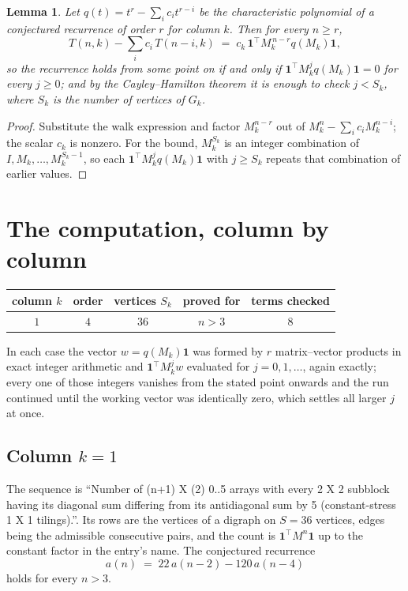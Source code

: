 \documentclass[11pt,a4paper]{article}
\theoremstyle{plain}
\newtheorem{lemma}[theorem]{Lemma}
\theoremstyle{definition}
\begin{document}
\begin{lemma}\label{lem:crit}
Let $q(t)=t^{r}-\sum_i c_it^{r-i}$ be the characteristic polynomial of a conjectured
recurrence of order $r$ for column $k$. Then for every $n\ge r$,
\[
T(n,k)-\sum_i c_i\,T(n-i,k)\;=\;c_k\,\mathbf{1}^{\!\top}M_k^{\,n-r}q(M_k)\mathbf{1},
\]
so the recurrence holds from some point on if and only if
$\mathbf{1}^{\!\top}M_k^{j}q(M_k)\mathbf{1}=0$ for every $j\ge0$; and by the
Cayley--Hamilton theorem it is enough to check $j<S_k$, where $S_k$ is the number of vertices
of $G_k$.
\end{lemma}

\begin{proof}
Substitute the walk expression and factor $M_k^{n-r}$ out of $M_k^{n}-\sum_ic_iM_k^{n-i}$;
the scalar $c_k$ is nonzero. For the bound, $M_k^{S_k}$ is an integer combination of
$I,M_k,\dots,M_k^{S_k-1}$, so each $\mathbf{1}^{\!\top}M_k^{j}q(M_k)\mathbf{1}$ with
$j\ge S_k$ repeats that combination of earlier values.
\end{proof}

\section{The computation, column by column}

\begin{center}
\begin{tabular}{ccccc}
column $k$ & order & vertices $S_k$ & proved for & terms checked \\ \hline
$1$ & $4$ & $36$ & $n>3$ & $8$ \\
\end{tabular}
\end{center}

In each case the vector $w=q(M_k)\mathbf{1}$ was formed by $r$ matrix--vector products in
exact integer arithmetic and $\mathbf{1}^{\!\top}M_k^{j}w$ evaluated for $j=0,1,\dots$,
again exactly; every one of those integers vanishes from the stated point onwards and the run
continued until the working vector was identically zero, which settles all larger $j$ at once.

\subsection*{Column $k=1$}
The sequence is ``Number of (n+1) X (2) 0..5 arrays with every 2 X 2 subblock having its diagonal sum differing from its antidiagonal sum by 5 (constant-stress 1 X 1 tilings).''. Its rows are the vertices of a digraph on
$S=36$ vertices, edges being the admissible consecutive pairs, and the count is
$\mathbf{1}^{\!\top}M^{n}\mathbf{1}$ up to the constant factor in the entry's name.
The conjectured recurrence
\[
a(n)\;=\;22\,a(n-2) - 120\,a(n-4)
\]
holds for every $n>3$.
\end{document}
